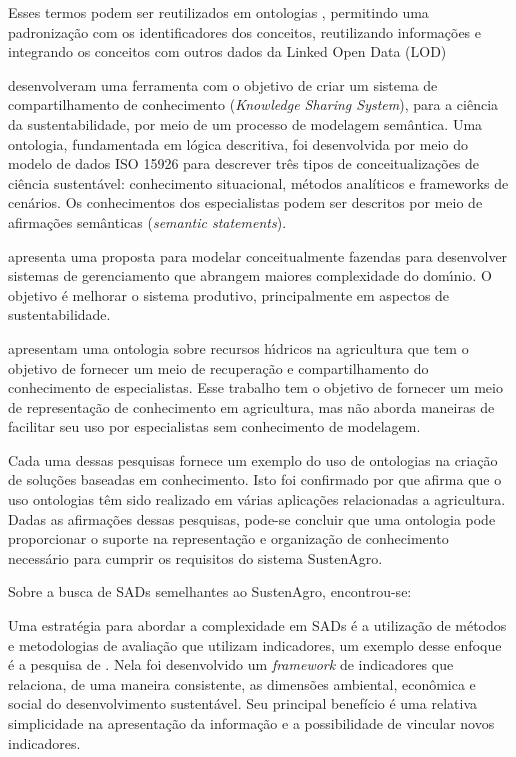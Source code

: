 Esses termos podem ser reutilizados em ontologias \citep{DCMIPro841},
permitindo uma padronização com os identificadores dos conceitos,
reutilizando informações e integrando os conceitos com outros dados
da \foreignlanguage{english}{Linked Open Data} (\foreignlanguage{english}{LOD})

\citet{kraines2011system} desenvolveram uma ferramenta com o objetivo
de criar um sistema de compartilhamento de conhecimento (\foreignlanguage{english}{\emph{Knowledge
Sharing System}}), para a ciência da sustentabilidade, por meio de
um processo de modelagem semântica. Uma ontologia, fundamentada em
lógica descritiva, foi desenvolvida por meio do modelo de dados ISO
15926 para descrever três tipos de conceitualizações de ciência sustentável:
conhecimento situacional, métodos analíticos e \foreignlanguage{english}{frameworks}
de cenários. Os conhecimentos dos especialistas podem ser descritos
por meio de afirmações semânticas (\foreignlanguage{english}{\emph{semantic
statements}}).

\citet{Abt2009} apresenta uma proposta para modelar conceitualmente
fazendas para desenvolver sistemas de gerenciamento que abrangem maiores
complexidade do dom\'{ı}nio. O objetivo é melhorar o sistema produtivo,
principalmente em aspectos de sustentabilidade. 

\citet{Bonacin:2013:CIA:2536146.2536185} apresentam uma ontologia
sobre recursos h\'{ı}dricos na agricultura que tem o objetivo de fornecer
um meio de recuperação e compartilhamento do conhecimento de especialistas.
Esse trabalho tem o objetivo de fornecer um meio de representação
de conhecimento em agricultura, mas não aborda maneiras de facilitar
seu uso por especialistas sem conhecimento de modelagem.

Cada uma dessas pesquisas fornece um exemplo do uso de ontologias
na criação de soluções baseadas em conhecimento. Isto foi confirmado
por \citep{roussey2010ontologies} que afirma que o uso ontologias
têm sido realizado em várias aplicações relacionadas a agricultura.
Dadas as afirmações dessas pesquisas, pode-se concluir que uma ontologia
pode proporcionar o suporte na representação e organização de conhecimento
necessário para cumprir os requisitos do sistema SustenAgro.

Sobre a busca de SADs semelhantes ao SustenAgro, encontrou-se: 

Uma estratégia para abordar a complexidade em SADs é a utilização
de métodos e metodologias de avaliação que utilizam indicadores, um
exemplo desse enfoque é a pesquisa de \citet{AlkanOlsson:2009}. Nela
foi desenvolvido um \foreignlanguage{english}{\emph{framework}} de
indicadores que relaciona, de uma maneira consistente, as dimensões
ambiental, econômica e social do desenvolvimento sustentável. Seu
principal benefício é uma relativa simplicidade na apresentação da
informação e a possibilidade de vincular novos indicadores.

